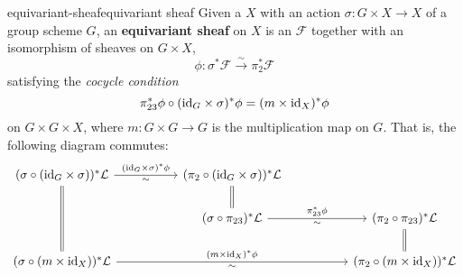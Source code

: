 \begin{topic}{equivariant-sheaf}{equivariant sheaf}
    Given a  $X$ with an action $\sigma : G \times X \to X$ of a group scheme $G$, an \textbf{equivariant sheaf} on $X$ is an  $\mathcal{F}$ together with an isomorphism of sheaves on $G \times X$,
    \[ \phi : \sigma^* \mathcal{F} \xrightarrow{\sim} \pi_2^* \mathcal{F} \]
    satisfying the \textit{cocycle condition}
    \[ \pi_{23}^* \phi \circ (\text{id}_G \times \sigma)^* \phi = (m \times \text{id}_X)^* \phi \]
    on $G \times G \times X$, where $m : G \times G \to G$ is the multiplication map on $G$. That is, the following diagram commutes:
    \[ \begin{tikzcd}[column sep=5em]
        (\sigma \circ (\id_G \times \sigma))^* \mathcal{L} \arrow["\sim{}"']{r}{(\id_G \times \sigma)^* \phi} \arrow[equal]{dd} & (\pi_2 \circ (\id_G \times \sigma))^* \mathcal{L} \arrow[equal]{d} & \\ & (\sigma \circ \pi_{23})^* \mathcal{L} \arrow["\sim{}"']{r}{\pi_{23}^* \phi} & (\pi_2 \circ \pi_{23})^* \mathcal{L} \arrow[equal]{d} \\ (\sigma \circ (m \times \id_X))^* \mathcal{L} \arrow["\sim{}"']{rr}{(m \times \id_X)^* \phi} & & (\pi_2 \circ (m \times \id_X))^* \mathcal{L}
    \end{tikzcd} \]
\end{topic}

